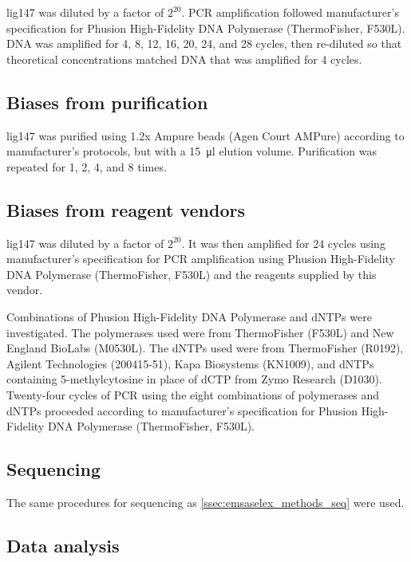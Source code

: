 \documentclass[parskip=full, numbers=noenddot]{scrreprt}
\begin{document}
lig147 was diluted by a factor of $2^{20}$.  PCR amplification followed manufacturer's specification for Phusion High-Fidelity DNA Polymerase (ThermoFisher, F530L).  DNA was amplified for 4, 8, 12, 16, 20, 24, and 28 cycles, then re-diluted so that theoretical concentrations matched DNA that was amplified for 4 cycles.

\subsection{Biases from purification}
\label{ssec:pcrbias_methods_pur}

lig147 was purified using 1.2x Ampure beads (Agen Court AMPure) according to manufacturer's protocols, but with a \SI{15}{\micro\litre} elution volume.  Purification was repeated for 1, 2, 4, and 8 times.

\subsection{Biases from reagent vendors}
\label{ssec:pcrbias_methods_reagent}

lig147 was diluted by a factor of $2^{20}$.  It was then amplified for 24 cycles using manufacturer's specification for PCR amplification using Phusion High-Fidelity DNA Polymerase (ThermoFisher, F530L) and the reagents supplied by this vendor.

Combinations of Phusion High-Fidelity DNA Polymerase and dNTPs were investigated.  The polymerases used were from ThermoFisher (F530L) and New England BioLabs (M0530L).  The dNTPs used were from ThermoFisher (R0192), Agilent Technologies (200415-51), Kapa Biosystems (KN1009), and dNTPs containing 5-methylcytosine in place of dCTP from Zymo Research (D1030).  Twenty-four cycles of PCR using the eight combinations of polymerases and dNTPs proceeded according to manufacturer's specification for Phusion High-Fidelity DNA Polymerase (ThermoFisher, F530L).

\subsection{Sequencing}
\label{ssec:pcrbias_methods_seq}

The same procedures for sequencing as \ref{ssec:emsaselex_methods_seq} were used.

\subsection{Data analysis}
\label{ssec:pcrbias_methods_anal}
\end{document}
